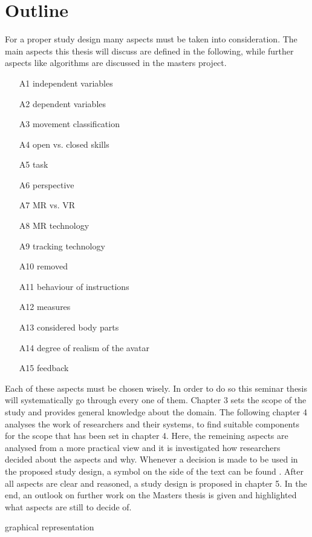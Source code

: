 \section{Outline}
For a proper study design many aspects must be taken into consideration. The main aspects this thesis will discuss are defined in the following, while further aspects like algorithms are discussed in the masters project.
\begin{itemize}
	\item[A1] independent variables%
	\item[A2] dependent variables%
	\item[A3] movement classification%
	\item[A4] open vs. closed skills%
	\item[A5] task%
	\item[A6] perspective%
	\item[A7] MR vs. VR%
	\item[A8] MR technology%
	\item[A9] tracking technology%
	\item[A10] removed \todo%
	\item[A11] behaviour of instructions%
	\item[A12] measures%
	\item[A13] considered body parts%
	\item[A14] degree of realism of the avatar%
	\item[A15] feedback%
\end{itemize}
Each of these aspects must be chosen wisely. In order to do so this seminar thesis will systematically go through every one of them. Chapter 3 sets the scope of the study and provides general knowledge about the domain. The following chapter 4 analyses the work of researchers and their systems, to find suitable components for the scope that has been set in chapter 4. Here, the remeining aspects are analysed from a more practical view and it is investigated how researchers decided about the aspects and why. Whenever a decision is made to be used in the proposed study design, a symbol on the side of the text can be found \markA. After all aspects are clear and reasoned, a study design is proposed in chapter 5. In the end, an outlook on further work on the Masters thesis is given and highlighted what aspects are still to decide of.

\todo graphical representation

